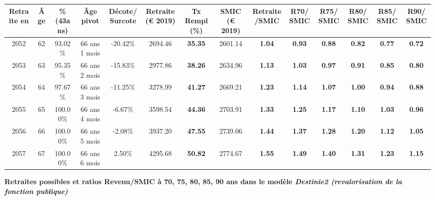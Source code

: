 \begin{adjustbox}{max width=\textwidth} 
\begin{tabular}[htb]{|c|c||c|c|c||c|c||c|c||c|c|c|c|c|} 
\hline 
 Retraite en &  Âge &  \%(43ans) &  Âge pivot &  Décote/Surcote &  Retraite (\euro{} 2019) &  Tx Rempl(\%) &  SMIC (\euro{} 2019) &  Retraite/SMIC &  R70/SMIC &  R75/SMIC &  R80/SMIC &  R85/SMIC &  R90/SMIC \\ 
\hline \hline 
 2052 &  62 &  93.02\% &  66 ans 1 mois &  -20.42\% &  2694.46 &  {\bf 35.35} &  2601.14 &  {\bf 1.04} &  {\bf {\color{red} 0.93}} &  {\bf {\color{red} 0.88}} &  {\bf {\color{red} 0.82}} &  {\bf {\color{red} 0.77}} &  {\bf {\color{red} 0.72}} \\ 
\hline 
 2053 &  63 &  95.35\% &  66 ans 2 mois &  -15.83\% &  2977.86 &  {\bf 38.26} &  2634.96 &  {\bf 1.13} &  {\bf 1.03} &  {\bf {\color{red} 0.97}} &  {\bf {\color{red} 0.91}} &  {\bf {\color{red} 0.85}} &  {\bf {\color{red} 0.80}} \\ 
\hline 
 2054 &  64 &  97.67\% &  66 ans 3 mois &  -11.25\% &  3278.99 &  {\bf 41.27} &  2669.21 &  {\bf 1.23} &  {\bf 1.14} &  {\bf 1.07} &  {\bf {\color{red} 1.00}} &  {\bf {\color{red} 0.94}} &  {\bf {\color{red} 0.88}} \\ 
\hline 
 2055 &  65 &  100.00\% &  66 ans 4 mois &  -6.67\% &  3598.54 &  {\bf 44.36} &  2703.91 &  {\bf 1.33} &  {\bf 1.25} &  {\bf 1.17} &  {\bf 1.10} &  {\bf 1.03} &  {\bf {\color{red} 0.96}} \\ 
\hline 
 2056 &  66 &  100.00\% &  66 ans 5 mois &  -2.08\% &  3937.20 &  {\bf 47.55} &  2739.06 &  {\bf 1.44} &  {\bf 1.37} &  {\bf 1.28} &  {\bf 1.20} &  {\bf 1.12} &  {\bf 1.05} \\ 
\hline 
 2057 &  67 &  100.00\% &  66 ans 6 mois &  2.50\% &  4295.68 &  {\bf 50.82} &  2774.67 &  {\bf 1.55} &  {\bf 1.49} &  {\bf 1.40} &  {\bf 1.31} &  {\bf 1.23} &  {\bf 1.15} \\ 
\hline 
\hline 
\end{tabular} 
\end{adjustbox} 
 
 \vspace{0.1cm} 
{\bf \noindent Retraites possibles et ratios Revenu/SMIC à 70, 75, 80, 85, 90 ans dans le modèle \emph{Destinie2 (revalorisation de la fonction publique)}}  
 
